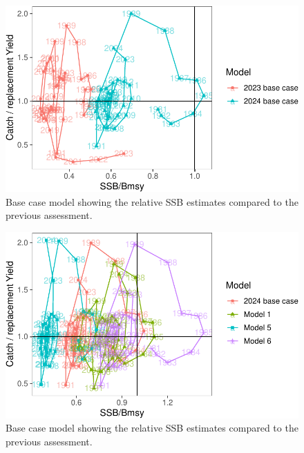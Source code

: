 \documentclass[
  letterpaper,
  DIV=11,
  numbers=noendperiod]{scrartcl}
\begin{document}
\begin{figure}[H]

{\centering \includegraphics{00-Namibian_hake_model_2024_files/figure-pdf/kobe-2.pdf}

}

\caption{Base case model showing the relative SSB estimates compared to
the previous assessment.}

\end{figure}%

\begin{figure}[H]

{\centering \includegraphics{00-Namibian_hake_model_2024_files/figure-pdf/kobe-3.pdf}

}

\caption{Base case model showing the relative SSB estimates compared to
the previous assessment.}

\end{figure}%
\end{document}
